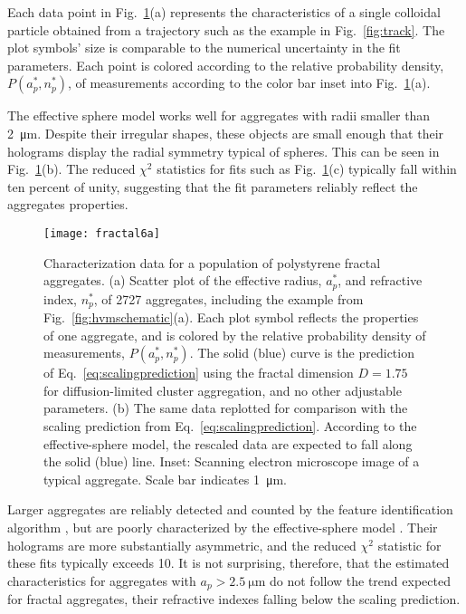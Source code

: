 Each data point in Fig.~\ref{fig:fractal}(a) represents the
characteristics of a single colloidal particle obtained from a
trajectory such as the example in Fig.~\ref{fig:track}.
The plot symbols'
size is comparable to the numerical uncertainty in the fit parameters.
Each point is colored according to the relative probability density,
$P(a_p^\ast,n_p^\ast)$, of measurements according to the color bar
inset into Fig.~\ref{fig:fractal}(a).

The effective sphere model works well for aggregates with radii
smaller than \SI{2}{\um}.
Despite their irregular shapes, these objects are small enough
that their holograms display the radial symmetry typical of
spheres.
This can be seen in Fig.~\ref{fig:fractal}(b).
The reduced $\chi^2$ statistics for fits such as
Fig.~\ref{fig:fractal}(c) typically
fall within ten percent of unity, suggesting that the fit
parameters reliably reflect the aggregates properties.

\begin{figure}[t!]
  \centering
  \texttt{[image: fractal6a]}
  \caption[Characterization of polystyrene fractal aggregates]
    {Characterization data for a population of polystyrene
    fractal aggregates. (a) Scatter plot of the effective radius,
    $a_p^\ast$, and refractive index, $n_p^\ast$, of \num{2727}
    aggregates, including the example from Fig.~\ref{fig:hvmschematic}(a).
    Each plot symbol reflects the properties of one aggregate, and
    is colored by the relative probability density of measurements, 
    $P(a_p^\ast,n_p^\ast)$.  The solid (blue) curve is the prediction of
    Eq.~\eqref{eq:scalingprediction} using the fractal dimension
    $D = \num{1.75}$ for diffusion-limited cluster aggregation,
    and no other adjustable parameters.
    (b) The same data replotted for comparison with the scaling
    prediction from Eq.~\eqref{eq:scalingprediction}.
    According to the effective-sphere model, the rescaled data are
    expected to fall along the solid (blue) line.
    Inset: Scanning electron microscope image of a typical aggregate.
    Scale bar indicates \SI{1}{\um}.
  }
  \label{fig:fractal}
\end{figure}

Larger aggregates are
reliably detected and counted by the feature identification algorithm \cite{krishnatreya14a},
but are poorly characterized by the effective-sphere model
\cite{wang16}.
Their holograms are more substantially asymmetric, and the
reduced $\chi^2$ statistic for these fits typically exceeds
\num{10}.
It is not surprising, therefore, that the estimated
characteristics for aggregates with $a_p > \SI{2.5}{\um}$
do not follow the trend expected for fractal aggregates, their refractive indexes
falling below the scaling prediction.

